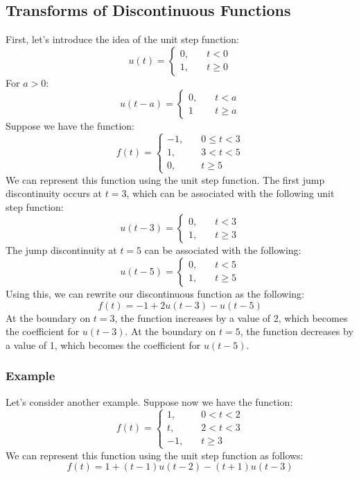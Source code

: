 \documentclass{math}
\begin{document}
\subsection*{Transforms of Discontinuous Functions}
First, let's introduce the idea of the unit step function:
\[ u(t) = \begin{cases}
  0, &\quad t<0 \\
  1, &\quad t\ge0
\end{cases} \]
For \( a>0 \):
\[ u(t-a) = \begin{cases}
  0, &\quad t<a \\
  1 &\quad t\ge a
\end{cases} \]
Suppose we have the function:
\[ f(t) = \begin{cases}
  -1, &\quad 0\le t<3 \\
  1, &\quad 3<t<5 \\
  0, &\quad t\ge 5
\end{cases} \]
We can represent this function using the unit step function. The first jump
discontinuity occurs at \( t = 3 \), which can be associated with the following
unit step function:
\[ u(t-3) = \begin{cases}
  0, &\quad t<3 \\
  1, &\quad t\ge3
\end{cases} \]
The jump discontinuity at \( t = 5 \) can be associated with the following:
\[ u(t-5) = \begin{cases}
  0, &\quad t<5 \\
  1, &\quad t\ge5
\end{cases} \]
Using this, we can rewrite our discontinuous function as the following:
\[ f(t) = -1+2u(t-3)-u(t-5) \]
At the boundary on \( t = 3 \), the function increases by a value of 2, which
becomes the coefficient for \( u(t-3) \). At the boundary on \( t = 5 \), the
function decreases by a value of 1, which becomes the coefficient for \( u(t-5)
\).

\subsubsection*{Example}
Let's consider another example. Suppose now we have the function:
\[ f(t) = \begin{cases}
  1, &\quad 0<t<2 \\
  t, &\quad 2<t<3 \\
  -1, &\quad t\ge3
\end{cases} \]
We can represent this function using the unit step function as follows:
\[ f(t) = 1+(t-1)u(t-2)-(t+1)u(t-3) \]
\end{document}
